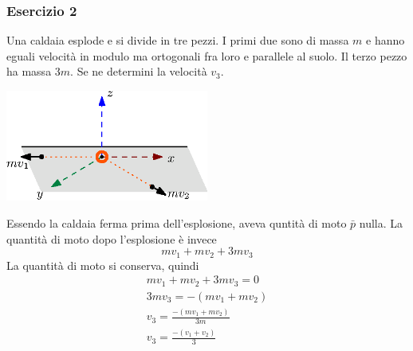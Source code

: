 \documentclass[10pt, letterpaper]{report}
\begin{document}
\subsubsection{Esercizio 2}
Una caldaia esplode e si divide in tre pezzi. I primi due sono di massa $m$ e hanno eguali velocità in modulo ma ortogonali fra loro e parallele al suolo. Il terzo pezzo ha massa $3m$. Se ne determini la velocità $v_3$.
\begin{center}
    \includegraphics[width=0.5\textwidth ]{images/caldaia.eps}
\end{center}
Essendo la caldaia ferma prima dell'esplosione, aveva quntità di moto $\bar p$ nulla. La quantità di moto dopo l'esplosione è invece 
$$ mv_1+mv_2+3mv_3$$
La quantità di moto si conserva, quindi 
\begin{eqnarray}
    mv_1+mv_2+3mv_3=0\\ 
    3mv_3=-(mv_1+mv_2)\\ 
    v_3=\frac{-(mv_1+mv_2)}{3m}\\
    v_3=\frac{-(v_1+v_2)}{3}
\end{eqnarray}
\end{document}
